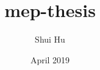 \documentclass[11pt, a4paper, twoside, titlepage, usenames,dvipsnames]{report}
\title{mep-thesis}
\author{Shui Hu}
\date{April 2019}
\begin{document}


\tableofcontents












%

\begin{appendices}
  
\end{appendices}




\end{document}
